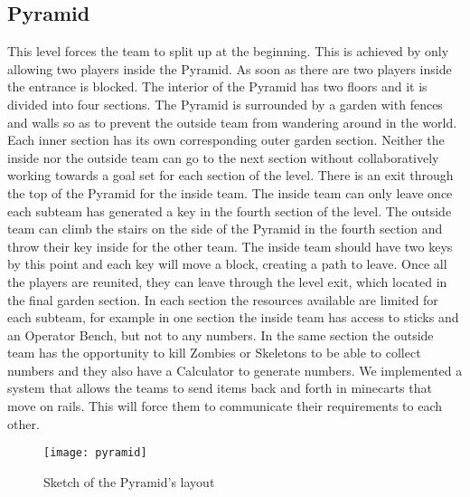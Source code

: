 \subsection{Pyramid}
This level forces the team to split up at the beginning. This is achieved by only allowing two players inside the Pyramid. As soon as there are two players inside the entrance is blocked.\newline\newline
The interior of the Pyramid has two floors and it is divided into four sections. The Pyramid is surrounded by a garden with fences and walls so as to prevent the outside team from wandering around in the world. Each inner section has its own corresponding outer garden section. Neither the inside nor the outside team can go to the next section without collaboratively working towards a goal set for each section of the level.\newline\newline
There is an exit through the top of the Pyramid for the inside team. The inside team can only leave once each subteam has generated a key in the fourth section of the level. The outside team can climb the stairs on the side of the Pyramid in the fourth section and throw their key inside for the other team. The inside team should have two keys by this point and each key will move a block, creating a path to leave. Once all the players are reunited, they can leave through the level exit, which located in the final garden section.\newline\newline
In each section the resources available are limited for each subteam, for example in one section the inside team has access to sticks and an Operator Bench, but not to any numbers. In the same section the outside team has the opportunity to kill Zombies or Skeletons to be able to collect numbers and they also have a Calculator to generate numbers.\newline\newline
We implemented a system that allows the teams to send items back and forth in minecarts that move on rails. This will force them to communicate their requirements to each other.\newline

\begin{figure}[h!]
\centering
\texttt{[image: pyramid]}
\caption{Sketch of the Pyramid's layout}
\end{figure}

